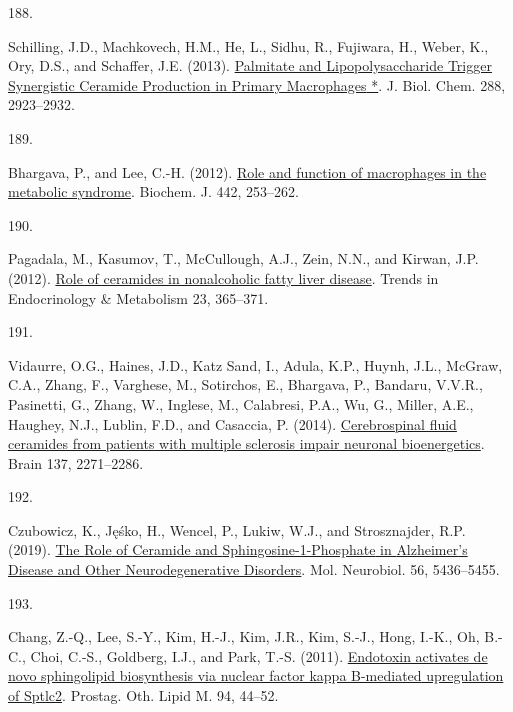\documentclass[
]{article}
\newlength{\cslhangindent}
\newlength{\csllabelwidth}
\newlength{\cslentryspacingunit} %
\newenvironment{CSLReferences}[2] %
 {%
  \setlength{\parindent}{0pt}
  \ifodd #1
  \let\oldpar\par
  \def\par{\hangindent=\cslhangindent\oldpar}
  \fi
  \setlength{\parskip}{#2\cslentryspacingunit}
 }%
 {}
\newcommand{\CSLLeftMargin}[1]{\parbox[t]{\csllabelwidth}{#1}}
\newcommand{\CSLRightInline}[1]{\parbox[t]{\linewidth - \csllabelwidth}{#1}\break}
\begin{document}
\begin{CSLReferences}{0}{0}
\leavevmode{}%
\CSLLeftMargin{188. }
\CSLRightInline{Schilling, J.D., Machkovech, H.M., He, L., Sidhu, R., Fujiwara, H., Weber, K., Ory, D.S., and Schaffer, J.E. (2013). \href{https://doi.org/10.1074/jbc.M112.419978}{Palmitate and {Lipopolysaccharide Trigger Synergistic Ceramide Production} in {Primary Macrophages} *}. J. Biol. Chem. 288, 2923--2932.}

\leavevmode{}%
\CSLLeftMargin{189. }
\CSLRightInline{Bhargava, P., and Lee, C.-H. (2012). \href{https://doi.org/10.1042/BJ20111708}{Role and function of macrophages in the metabolic syndrome}. Biochem. J. 442, 253--262.}

\leavevmode{}%
\CSLLeftMargin{190. }
\CSLRightInline{Pagadala, M., Kasumov, T., McCullough, A.J., Zein, N.N., and Kirwan, J.P. (2012). \href{https://doi.org/10.1016/j.tem.2012.04.005}{Role of ceramides in nonalcoholic fatty liver disease}. Trends in Endocrinology \& Metabolism 23, 365--371.}

\leavevmode{}%
\CSLLeftMargin{191. }
\CSLRightInline{Vidaurre, O.G., Haines, J.D., Katz Sand, I., Adula, K.P., Huynh, J.L., McGraw, C.A., Zhang, F., Varghese, M., Sotirchos, E., Bhargava, P., Bandaru, V.V.R., Pasinetti, G., Zhang, W., Inglese, M., Calabresi, P.A., Wu, G., Miller, A.E., Haughey, N.J., Lublin, F.D., and Casaccia, P. (2014). \href{https://doi.org/10.1093/brain/awu139}{Cerebrospinal fluid ceramides from patients with multiple sclerosis impair neuronal bioenergetics}. Brain 137, 2271--2286.}

\leavevmode{}%
\CSLLeftMargin{192. }
\CSLRightInline{Czubowicz, K., Jęśko, H., Wencel, P., Lukiw, W.J., and Strosznajder, R.P. (2019). \href{https://doi.org/10.1007/s12035-018-1448-3}{The {Role} of {Ceramide} and {Sphingosine-1-Phosphate} in {Alzheimer}'s {Disease} and {Other Neurodegenerative Disorders}}. Mol. Neurobiol. 56, 5436--5455.}

\leavevmode{}%
\CSLLeftMargin{193. }
\CSLRightInline{Chang, Z.-Q., Lee, S.-Y., Kim, H.-J., Kim, J.R., Kim, S.-J., Hong, I.-K., Oh, B.-C., Choi, C.-S., Goldberg, I.J., and Park, T.-S. (2011). \href{https://doi.org/10.1016/j.prostaglandins.2010.12.003}{Endotoxin activates de novo sphingolipid biosynthesis via nuclear factor kappa {B-mediated} upregulation of {Sptlc2}}. Prostag. Oth. Lipid M. 94, 44--52.}


\end{CSLReferences}
\end{document}
